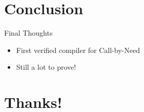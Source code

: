 \documentclass[17pt]{beamer}
\begin{document}
\section{Conclusion}
\begin{frame}{Final Thoughts}
\begin{itemize}
\item First verified compiler for Call-by-Need
\item Still a lot to prove!
\end{itemize}
\end{frame}

\section{Thanks!}

%
%
\end{document}
